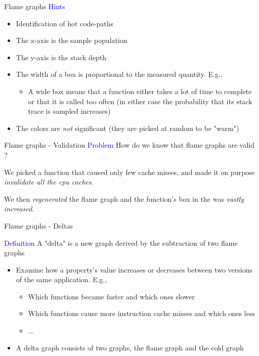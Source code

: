 \documentclass{beamer}
\begin{document}
\begin{frame}{Flame graphs}
\textcolor{blue}{Hints}
\begin{itemize}
\item Identification of hot code-paths
\item The x-axis is the sample population
\item The y-axis is the stack depth
\item The width of a box is proportional to the measured quantity. E.g.,
\begin{itemize}
\item A wide box means that a function either takes a lot of time to complete or
that it is called too often (in either case the probability that its stack trace
is sampled increases)
\end{itemize}
\item The colors are \textit{not} significant (they are picked at random to be "warm")
\end{itemize}
\end{frame}

\begin{frame}{Flame graphs - Validation}
\textcolor{blue}{Problem} How do we know that flame graphs are valid ?

\vspace{5mm}

We picked a function that caused only few cache misses, and made it on purpose
\textit{invalidate all the cpu caches}.

\vspace{5mm}

We then \textit{regenerated} the flame graph and the function's box in the was
\textit{vastly increased}.
\end{frame}

\begin{frame}{Flame graphs - Deltas}

\textcolor{blue}{Definition} A "delta" is a new graph derived
by the subtraction of two flame graphs
\begin{itemize}
\item Examine how a property's value increases or decreases between two versions
of the same application. E.g.,
\begin{itemize}
\item Which functions became faster and which ones slower
\item Which functions cause more instruction cache misses and which ones less
\item ...
\end{itemize}
\item A delta graph consists of two graphs, the flame graph and the cold graph
\end{itemize}

\end{frame}
\end{document}
